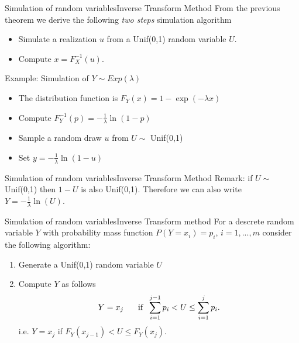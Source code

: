 \documentclass[handout]{beamer}
\begin{document}
\begin{frame}{Simulation of random variables}{Inverse Transform Method}
From the previous theorem we derive the following \emph{two steps} simulation algorithm
\begin{itemize}
  \item<1->Simulate a realization $u$ from a Unif(0,1) random variable $U$.
  \item<2-> Compute $x = F_X^{-1}(u)$.
\end{itemize}
\vspace{0.8cm}
Example: Simulation of $Y \sim Exp(\lambda)$
\begin{itemize}
 \item The distribution function is $F_Y(x)=1-\exp(-\lambda x)$
 \item Compute $F^{-1}_Y(p)=-\frac{1}{\lambda}\ln(1-p)$
 \item Sample a random draw $u$ from $U \sim$ Unif(0,1)
 \item Set $y = -\frac{1}{\lambda}\ln(1-u)$
\end{itemize}
\end{frame}


\begin{frame}{Simulation of random variables}{Inverse Transform Method}
\vspace{-4cm}
Remark: if $U \sim$ Unif(0,1) then $1-U$ is also Unif(0,1). Therefore we can 
also write $Y = -\frac{1}{\lambda}\ln(U)$.
\end{frame}

\begin{frame}{Simulation of random variables}{Inverse Transform method}
For a descrete random variable $Y$ with probability mass function $P(Y=x_i)=p_i$, $i=1, ...,m$ 
consider the following algorithm:
\begin{enumerate}
 \item Generate a Unif(0,1) random variable $U$
 \item Compute $Y$ as follows
\[
 Y = x_j \textnormal{\hspace{0.5cm} if \hspace{0.1cm}} \sum_{i=1}^{j-1} p_i < U \leq  \sum_{i=1}^{j} p_i.
\]
i.e. $Y = x_j$ if $F_Y(x_{j-1})< U \leq F_Y(x_j)$.
\end{enumerate}
\end{frame}
\end{document}

